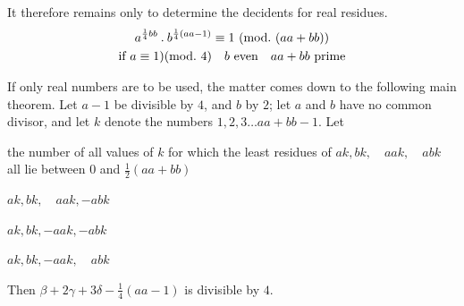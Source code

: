 It therefore remains only to determine the decidents for real residues.
\[
\begin{gathered}
a^{\frac14bb}\mathbin{.} b^{\frac14(aa-1)}\equiv1\ (\mathrm{mod.}\ (aa+bb))\\
\text{if }a\equiv1)(\mathrm{mod.}\ 4)\quad b\text{ even}\quad aa+bb\text{ prime}
\end{gathered}
\]

If only real numbers are to be used, the matter comes down to the following main theorem. Let $a-1$ be divisible by $4$, and $b$ by $2$; let $a$ and $b$ have no common divisor, and let $k$ denote the numbers $1,2,3\ldots aa+bb-1$.
Let
\begin{list}{}{\setlength{\labelwidth}{1.5em}\setlength{\leftmargin}{2em}}
\item[$\alpha$] the number of all values of $k$ for which the least residues of $ak,\allowbreak bk,\quad\allowbreak aak,\quad\allowbreak abk$ all lie between $0$ and $\frac12(aa+bb)$
\item[$\beta$] $ak,bk,\quad aak,-abk$
\item[$\gamma$] $ak,bk,-aak,-abk$
\item[$\delta$] $ak,bk,-aak,\quad abk$
\end{list}
Then $\beta+2\gamma+3\delta-\frac14(aa-1)$ is divisible by $4$.
